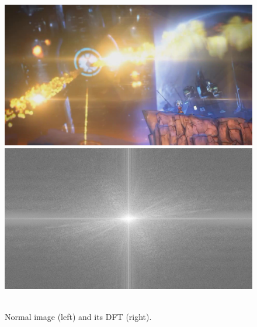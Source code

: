 \begin{figure}[H]
\centering
\includegraphics[scale=0.11]{images/bd.jpg}
\includegraphics[scale=0.11]{images/bd-14-ft.png}\\\hspace{\fill}\\[-2ex]
\caption[Fourier transform]{Normal image (left) and its DFT (right).}
\label{fig:fourier1}
\end{figure}
